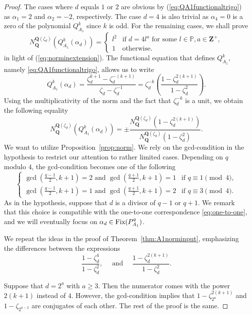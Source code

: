 \documentclass{amsart}
\newcommand{\Q}{\mathbf Q}
\newcommand{\Z}{\mathbf Z}
\newcommand{\Fix}{\textnormal{Fix}}
\newcommand{\cycl}[1]{\Q(\zeta_{#1})}
\numberwithin{equation}{section}
\theoremstyle{plain}
\theoremstyle{definition}
\begin{document}
\begin{proof}
The cases where $d$ equals $1$ or $2$ are obvious by (\ref{eq:QA1functionaltrigo}) as $\alpha_1=2$ and $\alpha_2=-2$, respectively. The case $d=4$ is also trivial as $\alpha_4=0$ is a zero of the polynomial $Q_{A_1}^k$ since $k$ is odd. For the remaining cases, we shall prove 
$$
N_{\Q}^{\Q(\zeta_d)}\left(Q_{A_1}^k(\alpha_d)\right) = 
\begin{cases}
	l^2 & \text{if } d = 4l^a\text{ for some }l\in\mathbb{P}, a\in\Z^{+},\\
	1 & \text{otherwise}.
\end{cases}
$$
in light of (\ref{eq:norminextension}). The functional equation that defines $Q_{A_1}^k$, namely \eqref{eq:QA1functionaltrigo}, allows us to write 
$$Q_{A_1}^k(\alpha_d)=\dfrac{\zeta_d^{k+1}-\zeta_d^{-(k+1)}}{\zeta_d-\zeta_d^{-1}}=\zeta_d^{-k}\left(\dfrac{1-\zeta_d^{2(k+1)}}{1-\zeta_d^2}\right).
$$
Using the multiplicativity of the norm and the fact that $\zeta_d^{-k}$ is a unit, we obtain the following equality
$$N_{\Q}^{\cycl{d}}(Q_{A_1}^k(\alpha_d))=\pm \frac{N_{\Q}^{\cycl{d}}\left(1-\zeta_d^{2(k+1)}\right)}{N_{\Q}^{\cycl{d}}\left(1-\zeta_d^2\right)}.
$$
We want to utilize Proposition~\ref{prop:norm}. We rely on the gcd-condition in the hypothesis to restrict our attention to rather limited cases. Depending on $q$ modulo $4$, the gcd-condition becomes one of the following
	$$
	\begin{cases}
		\gcd\left(\frac{q-1}{2}, k+1\right) = 2 \text{ and } \gcd\left(\frac{q+1}{2}, k+1\right) = 1 &\text{if } q\equiv1\pmod4,\\
		\gcd\left(\frac{q-1}{2}, k+1\right) = 1 \text{ and } \gcd\left(\frac{q+1}{2}, k+1\right) = 2 &\text{if } q\equiv3\pmod4.
	\end{cases}
	$$
As in the hypothesis, suppose that $d$ is a divisor of $q-1$ or $q+1$. We remark that this choice is compatible with the one-to-one correspondence \eqref{eq:one-to-one}, and we will eventually focus on $\alpha_d\in \Fix(P_{A_1}^q)$. 

We repeat the ideas in the proof of Theorem~\ref{thm:A1norminput}, emphasizing the differences between the expressions
\[ \frac{1-\zeta_d^4}{1-\zeta_d^2}, \quad \text{ and } \quad \dfrac{1-\zeta_d^{2(k+1)}}{1-\zeta_d^2}. \]

Suppose that $d=2^a$ with $a\ge 3$. Then the numerator comes with the power $2(k+1)$ instead of $4$. However, the gcd-condition implies that $1-\zeta_{2^a}^{2(k+1)}$ and  $1-\zeta_{2^{a-2}}$ are conjugates of each other. The rest of the proof is the same.  


\end{proof}
\end{document}
